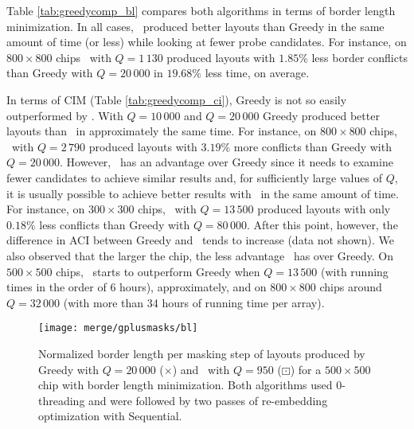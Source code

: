 Table \ref{tab:greedycomp_bl} compares both algorithms in terms of border length
minimization. In all cases, \Greedyplus\ produced better layouts than Greedy in
the same amount of time (or less) while looking at fewer probe candidates. For
instance, on $800\times 800$ chips \Greedyplus\ with $Q=1\,130$ produced layouts
with $1.85\%$ less border conflicts than Greedy with $Q=20\,000$ in $19.68\%$
less time, on average.

In terms of CIM (Table \ref{tab:greedycomp_ci}), Greedy is not so easily
outperformed by \Greedyplus. With $Q=10\,000$ and $Q=20\,000$ Greedy produced
better layouts than \Greedyplus\ in approximately the same time. For instance,
on $800\times 800$ chips, \Greedyplus\ with $Q=2\,790$ produced layouts with
$3.19\%$ more conflicts than Greedy with $Q=20\,000$. However, \Greedyplus\ has
an advantage over Greedy since it needs to examine fewer candidates to achieve
similar results and, for sufficiently large values of $Q$, it is usually
possible to achieve better results with \Greedyplus\ in the same amount of time.
For instance, on $300\times 300$ chips, \Greedyplus\ with $Q=13\,500$ produced
layouts with only $0.18\%$ less conflicts than Greedy with $Q=80\,000$. After
this point, however, the difference in ACI between Greedy and \Greedyplus\ tends
to increase (data not shown). We also observed that the larger the chip, the
less advantage \Greedyplus\ has over Greedy. On $500\times 500$ chips,
\Greedyplus\ starts to outperform Greedy when $Q=13\,500$ (with running times in
the order of 6 hours), approximately, and on $800\times 800$ chips around
$Q=32\,000$ (with more than 34 hours of running time per array).

\begin{figure}[t]\centering
\texttt{[image: merge/gplusmasks/bl]}
\caption{\label{fig:gplus_blm}%
  Normalized border length per masking step of layouts produced by Greedy with
  $Q=20\,000$ ({\tiny $\times$}) and \Greedyplus\ with $Q=950$
  ({\tiny $\boxdot$}) for a $500\times 500$ chip with border length
  minimization. Both algorithms used $0$-threading and were followed by two
  passes of re-embedding optimization with Sequential.}
\end{figure}

